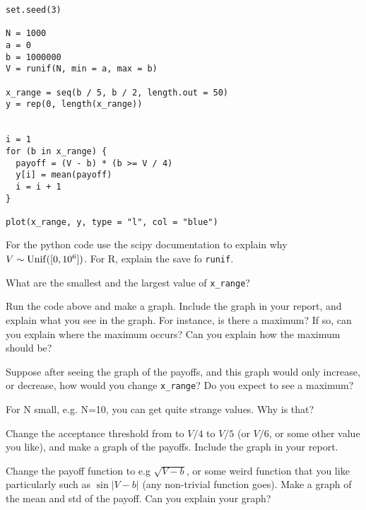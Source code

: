 \documentclass[assignments]{subfiles}
\begin{document}
\begin{verbatim}
set.seed(3)

N = 1000
a = 0
b = 1000000
V = runif(N, min = a, max = b)

x_range = seq(b / 5, b / 2, length.out = 50)
y = rep(0, length(x_range))


i = 1
for (b in x_range) {
  payoff = (V - b) * (b >= V / 4)
  y[i] = mean(payoff)
  i = i + 1
}

plot(x_range, y, type = "l", col = "blue")
\end{verbatim}


\begin{exercise}
For the python code use the scipy documentation to explain why $V\sim\mathrm{Unif}([0,10^{6}])$. For R, explain the save fo \texttt{runif}.
\end{exercise}



\begin{exercise}
What are the smallest and the largest value of \verb|x_range|?
\end{exercise}

\begin{exercise}
Run the code above and make a graph. Include the graph in your report, and explain what you see in the graph. For instance, is there a maximum? If so, can you explain where the maximum occurs? Can you explain how the maximum should be?
\end{exercise}


\begin{exercise}
Suppose after seeing the graph of the payoffs, and this graph would only increase, or decrease, how would you change \verb|x_range|? Do you expect to see a maximum?
\end{exercise}




\begin{exercise}
For N small, e.g. N=10, you can get quite strange values. Why is that?
\end{exercise}


\begin{exercise}
Change the acceptance threshold from to $V/4$ to $V/5$ (or $V/6$, or some other value you like), and make a graph of the payoffs.
Include the graph in your report.
\end{exercise}

\begin{exercise}
Change the payoff function to e.g $\sqrt{V-b}$, or some weird function that you like particularly such as $\sin |V-b|$ (any non-trivial function goes).
Make a graph of the  mean and std of the payoff. Can you explain your graph?
\end{exercise}
\end{document}
